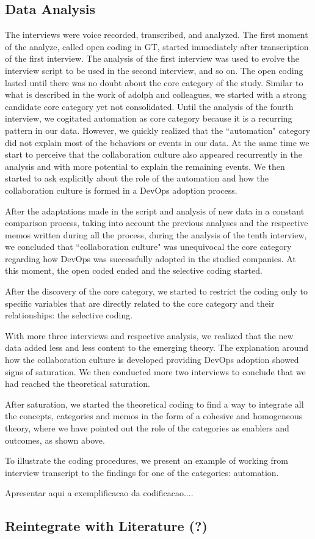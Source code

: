 \subsection{Data Analysis}
The interviews were voice recorded, transcribed, and analyzed. The first moment
of the analyze, called open coding in GT, started immediately after
transcription of the first interview. The analysis of the
first interview was used to evolve the interview script to be used in
the second interview, and so on. The open coding lasted until there was no
doubt about the core category of the study. Similar to what is described in
the work of adolph and colleagues\cite{adolph2012reconciling}, we started
with a strong candidate core category yet not consolidated. Until
the analysis of the fourth interview, we cogitated automation as core
category because it is a recurring pattern in our data. However, we quickly
realized that the ``automation" category did not explain most of the behaviors
or events in our data. At the same time we start to perceive that the
collaboration culture also appeared recurrently in the analysis and with more
potential to explain the remaining events. We then started to ask explicitly
about the role of the automation and how the collaboration culture is formed
in a DevOps adoption process.

After the adaptations made in the script and analysis of new data in a constant
comparison process, taking into account the previous analyses and the
respective memos written during all the process, during the analysis of the tenth
interview, we concluded that ``collaboration culture" was unequivocal the core
category regarding how DevOps was successfully adopted in the studied companies.
At this moment, the open coded ended and the selective coding started.

After the discovery of the core category, we started to restrict the coding only
to specific variables that are directly related to the core category and their
relationships: the selective coding.

With more three interviews and respective analysis, we realized that
the new data added less and less content to the emerging theory. The
explanation around how the collaboration culture is developed providing
DevOps adoption showed signs of saturation. We then conducted more two
interviews to conclude that we had reached the theoretical saturation.

After saturation, we started the theoretical coding to find a way to integrate
all the concepts, categories and memos in the form of a cohesive and
homogeneous theory, where we have pointed out the role of the categories as
enablers and outcomes, as shown above.

To illustrate the coding procedures, we present an example of working from
interview transcript to the findings for one of the categories: automation.


Apresentar aqui a exemplificacao da codificacao....

\subsection{Reintegrate with Literature (?)}
